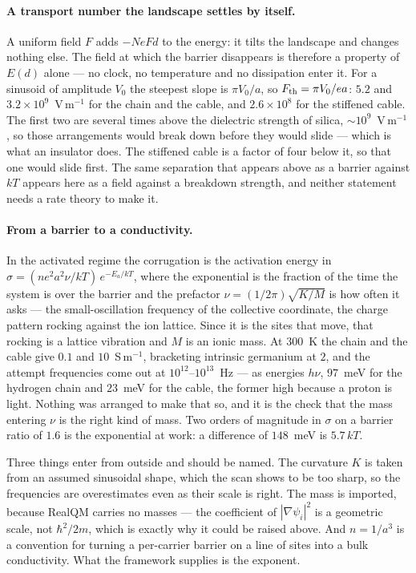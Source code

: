 \paragraph{A transport number the landscape settles by itself.}
A uniform field $F$ adds $-NeFd$ to the energy: it tilts the landscape and changes nothing else. The
field at which the barrier disappears is therefore a property of $E(d)$ alone --- no clock, no
temperature and no dissipation enter it. For a sinusoid of amplitude $V_0$ the steepest slope is
$\pi V_0/a$, so $F_{\rm th}=\pi V_0/ea$: $5.2$ and $3.2\times10^{9}$~V\,m$^{-1}$ for the chain and
the cable, and $2.6\times10^{8}$ for the stiffened cable. The first two are several times above the
dielectric strength of silica, ${\sim}10^{9}$~V\,m$^{-1}$, so those arrangements would break down
before they would slide --- which is what an insulator does. The stiffened cable is a factor of four
below it, so that one would slide first. The same separation that appears above as a barrier against
$kT$ appears here as a field against a breakdown strength, and neither statement needs a rate theory
to make it.

\paragraph{From a barrier to a conductivity.}
In the activated regime the corrugation is the activation energy in
$\sigma=(ne^2a^2\nu/kT)\,e^{-E_a/kT}$, where the exponential is the fraction of the time the system
is over the barrier and the prefactor $\nu=(1/2\pi)\sqrt{K/M}$ is how often it asks --- the
small-oscillation frequency of the collective coordinate, the charge pattern rocking against the ion
lattice. Since it is the sites that move, that rocking is a lattice vibration and $M$ is an ionic
mass. At $300$~K the chain and the cable give $0.1$ and $10$~S\,m$^{-1}$, bracketing intrinsic
germanium at $2$, and the attempt frequencies come out at $10^{12}$--$10^{13}$~Hz --- as energies
$h\nu$, $97$~meV for the hydrogen chain and $23$~meV for the cable, the former high because a proton
is light. Nothing was arranged to make that so, and it is the check that the mass entering $\nu$ is
the right kind of mass. Two orders of magnitude in $\sigma$ on a barrier ratio of $1.6$ is the
exponential at work: a difference of $148$~meV is $5.7\,kT$.

Three things enter from outside and should be named. The curvature $K$ is taken from an assumed
sinusoidal shape, which the scan shows to be too sharp, so the frequencies are overestimates even as
their scale is right. The mass is imported, because RealQM carries no masses --- the coefficient of
$|\nabla\psi_i|^2$ is a geometric scale, not $\hbar^2/2m$, which is exactly why it could be raised
above. And $n=1/a^3$ is a convention for turning a per-carrier barrier on a line of sites into a
bulk conductivity. What the framework supplies is the exponent.

